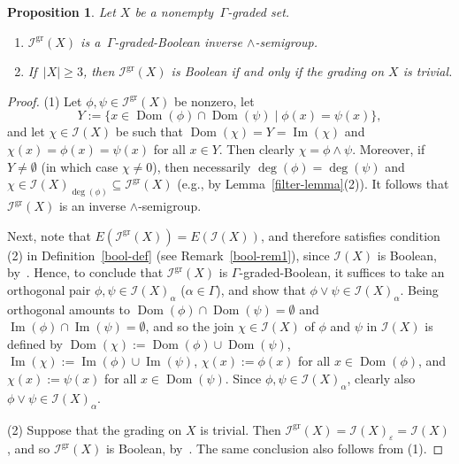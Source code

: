 \documentclass[a4paper,reqno,12pt]{amsart}
\numberwithin{equation}{section}
\theoremstyle{plain}
\newtheorem{prop}[thm]{Proposition}
\theoremstyle{definition}
\newcommand{\im}{\operatorname{Im}}
\newcommand{\dom}{\operatorname{Dom}}
\newcommand{\gr}{\operatorname{gr}}
\begin{document}
\begin{prop} \label{gr-sym-inv-semgp}
Let $X$ be a nonempty $\, \Gamma$-graded set. 
\begin{enumerate}[\upshape(1)]
\item $\mathcal{I}^{\gr}(X)$ is a $\, \Gamma$-graded-Boolean inverse $\land$-semigroup.

\smallskip 

\item If $\, |X| \geq 3$, then $\mathcal{I}^{\gr}(X)$ is Boolean if and only if the grading on $X$ is trivial.
\end{enumerate}
\end{prop}

\begin{proof}
(1) Let $\phi, \psi \in \mathcal{I}^{\gr}(X)$ be nonzero, let 
\[Y := \big\{x \in \dom(\phi) \cap \dom(\psi) \mid \phi(x) = \psi(x)\big\},\]
and let $\chi \in \mathcal{I}(X)$ be such that $\dom(\chi) = Y = \im(\chi)$ and $\chi(x) = \phi(x) = \psi(x)$ for all $x \in Y$. Then clearly $\chi = \phi \land \psi$. Moreover, if $Y \neq \emptyset$ (in which case $\chi \neq 0$), then necessarily $\deg(\phi) = \deg(\psi)$ and $\chi \in \mathcal{I}(X)_{\deg(\phi)} \subseteq \mathcal{I}^{\gr}(X)$ (e.g., by Lemma~\ref{filter-lemma}(2)). It follows that $\mathcal{I}^{\gr}(X)$ is an inverse $\land$-semigroup.

Next, note that $E(\mathcal{I}^{\gr}(X)) = E(\mathcal{I}(X))$, and therefore satisfies condition (2) in Definition~\ref{bool-def} (see Remark~\ref{bool-rem1}), since $\mathcal{I}(X)$ is Boolean, by~\cite[Example 2.25]{Lawson2}. Hence, to conclude that $\mathcal{I}^{\gr}(X)$ is $\Gamma$-graded-Boolean, it suffices to take an orthogonal pair $\phi, \psi \in \mathcal{I}(X)_{\alpha}$ ($\alpha \in \Gamma$), and show that $\phi \lor \psi \in \mathcal{I}(X)_{\alpha}$. Being orthogonal amounts to $\dom(\phi) \cap \dom (\psi) = \emptyset$ and $\im(\phi) \cap \im (\psi) = \emptyset$, and so the join $\chi \in \mathcal{I}(X)$ of $\phi$ and $\psi$ in $\mathcal{I}(X)$ is defined by $\dom(\chi) := \dom(\phi) \cup \dom(\psi)$, $\im(\chi) := \im(\phi) \cup \im(\psi)$, $\chi(x) := \phi(x)$ for all $x \in \dom(\phi)$, and $\chi(x) := \psi(x)$ for all $x \in \dom(\psi)$. Since $\phi, \psi \in \mathcal{I}(X)_{\alpha}$, clearly also $\phi \lor \psi \in \mathcal{I}(X)_{\alpha}$.

\smallskip

(2) Suppose that the grading on $X$ is trivial. Then $\mathcal{I}^{\gr}(X) = \mathcal{I}(X)_{\varepsilon} = \mathcal{I}(X)$, and so $\mathcal{I}^{\gr}(X)$ is Boolean, by~\cite[Example 2.25]{Lawson2}. The same conclusion also follows from (1).


\end{proof}
\end{document}
